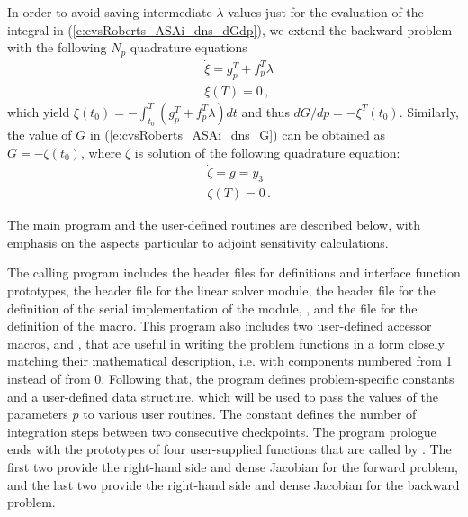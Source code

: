 In order to avoid saving intermediate $\lambda$ values just for the
evaluation of the integral in (\ref{e:cvsRoberts_ASAi_dns_dGdp}), we extend the
backward problem with the following $N_p$ quadrature equations
\begin{equation}\label{e:cvsRoberts_ASAi_dns_XI}
  \begin{split}
    &{\dot\xi} = g_p^T + f_p^T \lambda \\
    &\xi (T) = 0 \, ,
  \end{split}
\end{equation}
which yield $\xi(t_0) = - \int_{t_0}^{T} ( g_p^T + f_p^T \lambda) dt$
and thus ${dG}/{dp} = -\xi^T(t_0)$.
Similarly, the value of $G$ in (\ref{e:cvsRoberts_ASAi_dns_G}) can be obtained as
$G = - \zeta(t_0)$, where $\zeta$ is solution of the following quadrature
equation:
\begin{equation}\label{e:cvsRoberts_ASAi_dns_ZETA}
  \begin{split}
    &{\dot\zeta} = g = y_3 \\
    &\zeta(T) = 0 \, .
  \end{split}
\end{equation}

The main program and the user-defined routines are described below, 
with emphasis on the aspects particular to adjoint sensitivity calculations.

The calling program includes the {\cvodes} header files  
for {\cvodes} definitions and interface function prototypes,
the header file  for the {\cvdense} linear solver module,
the header file  for the definition of the serial implementation
of the {\nvector} module, {\nvecs}, and the file  for the
definition of the  macro.
This program also includes two user-defined accessor macros,  and ,
that are useful in writing the problem functions in a form closely matching their
mathematical description, i.e. with components numbered from 1 instead of from 0. 
Following that, the program defines problem-specific constants and a user-defined 
data structure, which will be used to pass the values of the parameters $p$ to various
user routines. The constant  defines the number of integration steps
between two consecutive checkpoints.
The program prologue ends with the prototypes of four user-supplied functions that are
called by {\cvodes}. The first two provide the right-hand side and dense Jacobian
for the forward problem, and the last two provide the right-hand side and dense
Jacobian for the backward problem.


